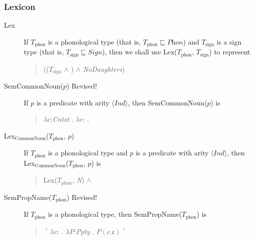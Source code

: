   



\subsubsection{Lexicon}
\begin{description}
\item[\textnormal{Lex}] \mbox{}

  If $T_{\mathrm{phon}}$ is a phonological type (that is,
$T_{\mathrm{phon}}\sqsubseteq\textit{Phon}$) and $T_{\mathrm{sign}}$
is a sign type (that is, $T_{\mathrm{sign}}\sqsubseteq\textit{Sign}$), then we shall use
Lex($T_{\mathrm{phon}}$, $T_{\mathrm{sign}}$) to represent
\begin{quote}
(($T_{\mathrm{sign}}$ \d{$\wedge$}
)
\d{$\wedge$} \textit{NoDaughters})
\end{quote}

\item[\textnormal{SemCommonNoun($p$)} Revised!] \mbox{}

  If $p$ is a predicate with arity $\langle\textit{Ind}\rangle$, then SemCommonNoun($p$) is
  \begin{quote}
    $\lambda c$:\textit{Cntxt} . $\lambda
r$:
. 
\end{quote}

\item[\textnormal{Lex$_{\mathrm{CommonNoun}}$($T_{\mathrm{phon}}$,
    $p$)}] \mbox{}

  If $T_{\mathrm{phon}}$ is a phonological type and $p$ is a
  predicate with arity $\langle\textit{Ind}\rangle$, then Lex$_{\mathrm{CommonNoun}}$($T_{\mathrm{phon}}$,
  $p$) is
  \begin{quote}
    Lex($T_{\mathrm{phon}}$, \textit{N}) \d{$\wedge$}
  \end{quote}
  
\item[\textnormal{SemPropName($T_{\text{phon}}$)} Revised!] \mbox{}

  If $T_{\text{phon}}$ is a phonological type, then SemPropName($T_{\text{phon}}$) is
  \begin{quote}
    $\ulcorner\lambda c$: . $\lambda
                       P$:\textit{Ppty} . $P(c.\mathfrak{c})\urcorner$
  \end{quote}
  

\end{description}
